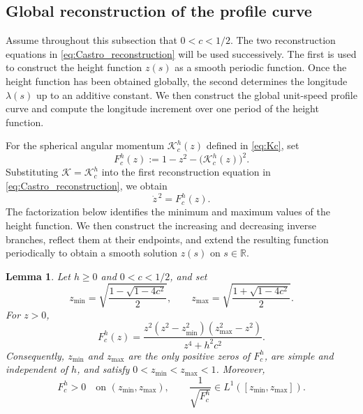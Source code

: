 \documentclass[a4paper,11pt]{amsart}
\numberwithin{equation}{section}
\theoremstyle{plain}
\newtheorem{lem}[thm]{Lemma}
\begin{document}
\subsection{Global reconstruction of the profile curve}

Assume throughout this subsection that $0<c<1/2$. The two reconstruction
equations in \eqref{eq:Castro_reconstruction} will be used successively.
The first is used to construct the height function $z(s)$ as a smooth periodic
function. Once the height function has been obtained globally, the second
determines the longitude $\lambda(s)$ up to an additive constant. We then construct the
global unit-speed profile curve and compute the longitude increment over one
period of the height function.

For the spherical angular momentum $\mathcal K_c^h(z)$ defined in \eqref{eq:Kc}, set
\begin{equation}\label{eq:Fhc_definition}
F_{c}^{h}(z)
:=
1-z^2-\bigl(\mathcal K_c^h(z)\bigr)^2.
\end{equation}
Substituting $\mathcal K=\mathcal K_c^h$ into the first reconstruction
equation in \eqref{eq:Castro_reconstruction}, we obtain
\[
\dot z^{\,2}=F_c^h(z).
\]
The factorization below identifies the minimum and maximum values of the
height function. We then construct the increasing and decreasing inverse
branches, reflect them at their endpoints, and extend the resulting
function periodically to obtain a smooth solution $z(s)$ on $s\in\mathbb R$.

\begin{lem}\label{lem:height_range_factorization}
Let $h\geq0$ and $0<c<1/2$, and set
\begin{equation}\label{eq:height_extrema}
z_{\min}
=
\sqrt{\frac{1-\sqrt{1-4c^2}}{2}},
\qquad
z_{\max}
=
\sqrt{\frac{1+\sqrt{1-4c^2}}{2}}.
\end{equation}
For $z>0$,
\begin{equation}\label{eq:Fhc_factorization}
F_{c}^{h}(z)
=
\frac{z^2(z^2-z_{\min}^2)(z_{\max}^2-z^2)}
     {z^4+h^2c^2}.
\end{equation}
Consequently, $z_{\min}$ and $z_{\max}$ are the only positive zeros
of $F_{c}^{h}$, are simple and independent of $h$, and satisfy
$0<z_{\min}<z_{\max}<1$. Moreover,
\[
F_{c}^{h}>0
\quad\text{on }(z_{\min},z_{\max}),
\qquad
\frac{1}{\sqrt{F_{c}^{h}}}
\in L^1([z_{\min},z_{\max}]).
\]
\end{lem}
\end{document}
